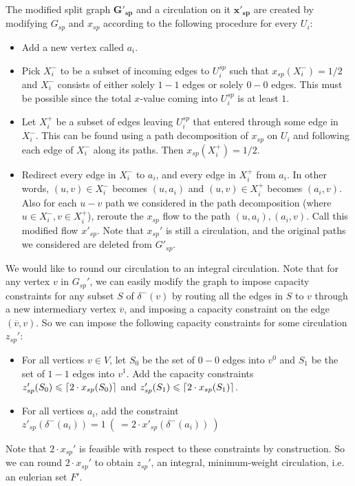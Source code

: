 \documentclass[./main.tex]{subfiles}
\DeclarePairedDelimiter\ceil{\lceil}{\rceil}
\begin{document}
		\begin{definition}\label{def:6.1}
			The modified split graph $\bm{G'_{sp}}$ and a circulation on it $\bm{x'_{sp}}$ are created by modifying $G_{sp}$ and $x_{sp}$ according to the following procedure for every $U_i$:
			\begin{itemize}[-]
				\item Add a new vertex called $a_i$.
				\item Pick $X_i^-$ to be a subset of incoming edges to $U_i^{sp}$ such that $x_{sp}(X_i^-) = 1/2$ and $X_i^-$ consists of either solely $1-1$ edges or solely $0-0$ edges. This must be possible since the total $x$-value coming into $U_i^{sp}$ is at least $1$.
				\item Let $X_i^+$ be a subset of edges leaving $U_i^{sp}$ that entered through some edge in $X_i^-$. This can be found using a path decomposition of $x_{sp}$ on $U_i$ and following each edge of $X_i^-$ along its paths. Then $x_{sp}(X_i^+) = 1/2$.
				\item Redirect every edge in $X_i^-$ to $a_i$, and every edge in $X_i^+$ from $a_i$. In other words, $(u,v)\in X_i^-$ becomes $(u,a_i)$ and $(u,v)\in X_i^+$ becomes $(a_i, v)$. Also for each $u-v$ path we considered in the path decomposition (where $u\in X_i^-, v\in X_i^+$), reroute the $x_{sp}$ flow to the path $(u,a_i),(a_i,v)$. Call this modified flow $x'_{sp}$. Note that $x_{sp}'$ is still a circulation, and the original paths we considered are deleted from $G'_{sp}$.\\
			\end{itemize}
		\end{definition}
		We would like to round our circulation to an integral circulation.
		Note that for any vertex $v$ in $G_{sp}'$, we can easily modify the graph to impose capacity constraints for any subset $S$ of $\delta^-(v)$ by routing all the edges in $S$ to $v$ through a new intermediary vertex $\overline{v}$, and imposing a capacity constraint on the edge $(\overline{v},v)$.
		So we can impose the following capacity constraints for some circulation $z_{sp}'$:
		\begin{itemize}[-]
			\item For all vertices $v\in V$, let $S_0$ be the set of $0-0$ edges into $v^0$ and $S_1$ be the set of $1-1$ edges into $v^1$.
					Add the capacity constraints $z'_{sp}(S_0)\leqslant \ceil{2\cdot x_{sp}(S_0)}$ and $z'_{sp}(S_1)\leqslant \ceil{2\cdot x_{sp}(S_1)}$.
			\item For all vertices $a_i$, add the constraint $z'_{sp}(\delta^-(a_i)) = 1\  (\ = 2\cdot x'_{sp}(\delta^-(a_i))\ )$
		\end{itemize}
		Note that $2\cdot x_{sp}'$ is feasible with respect to these constraints by construction.
		So we can round $2\cdot x_{sp}'$ to obtain $z_{sp}'$, an integral, minimum-weight circulation, i.e. an eulerian set $F'$.\\
		\vspace{2mm}
\end{document}
